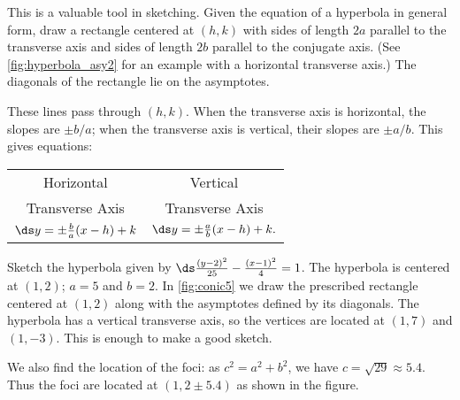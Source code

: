This is a valuable tool in sketching. Given the equation of a hyperbola in general form, draw a rectangle centered at $(h,k)$ with sides of length $2a$ parallel to the transverse axis and sides of length $2b$ parallel to the conjugate axis. (See \autoref{fig:hyperbola_asy2} for an example with a horizontal transverse axis.) The diagonals of the rectangle lie on the asymptotes. 

These lines pass through $(h,k)$.  When the transverse axis is horizontal, the slopes are $\pm b/a$; when the transverse axis is vertical, their slopes are $\pm a/b$. This gives equations:
\begin{center}
\begin{tabular}{cc}
Horizontal & Vertical \\
Transverse Axis & Transverse Axis \\\addlinespace
$\ds y=\pm\frac ba(x-h)+k$  &$\ds  y=\pm\frac ab(x-h)+k.$
\end{tabular}
\end{center}


\begin{example}\label{ex_conic5}%
Sketch the hyperbola given by $\ds \frac{(y-2)^2}{25}-\frac{(x-1)^2}{4}=1$.
\solution
The hyperbola is centered at $(1,2)$; $a=5$ and $b=2$.
In \autoref{fig:conic5} we draw the prescribed rectangle centered at $(1,2)$ along with the asymptotes defined by its diagonals. The hyperbola has a vertical transverse axis, so the vertices are located at $(1,7)$ and $(1,-3)$. This is enough to make a good sketch.

We also find the location of the foci: as $c^2= a^2+b^2$, we have $c=\sqrt{29}\approx 5.4$. Thus the foci are located at $(1,2\pm 5.4)$ as shown in the figure.
\end{example}

